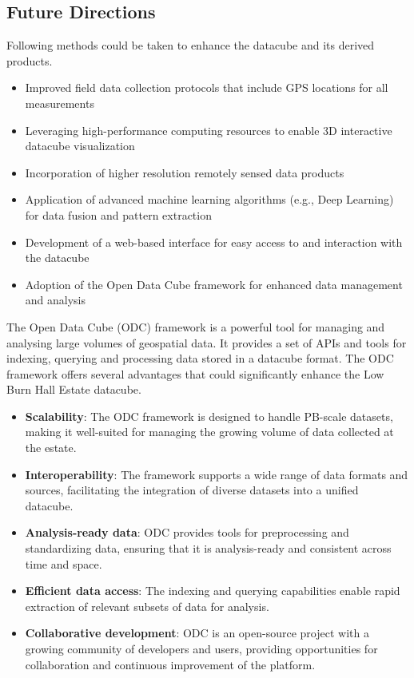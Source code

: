 \documentclass{article}
\begin{document}
\subsection{Future Directions}

Following methods could be taken to enhance the datacube and its derived products.

\begin{itemize}
	\item Improved field data collection protocols that include GPS locations for all measurements
	\item Leveraging high-performance computing resources to enable 3D interactive datacube visualization
	\item Incorporation of higher resolution remotely sensed data products
	\item Application of advanced machine learning algorithms (e.g., Deep Learning) for data fusion and pattern extraction
	\item Development of a web-based interface for easy access to and interaction with the datacube
	\item Adoption of the Open Data Cube framework for enhanced data management and analysis
\end{itemize}

The Open Data Cube (ODC) framework is a powerful tool for managing and analysing large volumes of geospatial data. It provides a set of APIs and tools for indexing, querying and processing data stored in a datacube format. The ODC framework offers several advantages that could significantly enhance the Low Burn Hall Estate datacube.

\begin{itemize}
	\item \textbf{Scalability}: The ODC framework is designed to handle PB-scale datasets, making it well-suited for managing the growing volume of data collected at the estate.
	\item \textbf{Interoperability}: The framework supports a wide range of data formats and sources, facilitating the integration of diverse datasets into a unified datacube.
	\item \textbf{Analysis-ready data}: ODC provides tools for preprocessing and standardizing data, ensuring that it is analysis-ready and consistent across time and space.
	\item \textbf{Efficient data access}: The indexing and querying capabilities enable rapid extraction of relevant subsets of data for analysis.
	\item \textbf{Collaborative development}: ODC is an open-source project with a growing community of developers and users, providing opportunities for collaboration and continuous improvement of the platform.
\end{itemize}
\end{document}
